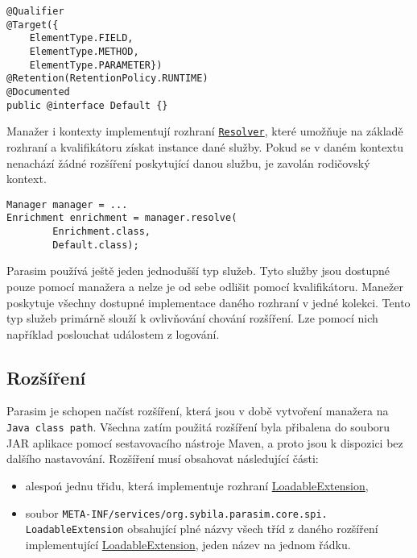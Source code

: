 \begin{lstlisting}[label={code:qualifier}, caption={Kvalikátor}]
@Qualifier
@Target({
	ElementType.FIELD,
	ElementType.METHOD,
	ElementType.PARAMETER})
@Retention(RetentionPolicy.RUNTIME)
@Documented
public @interface Default {}
\end{lstlisting}

Manažer i kontexty implementují rozhraní \href{https://github.com/sybila/parasim/blob/master/core/src/main/java/org/sybila/parasim/core/api/Resolver.java}{\texttt{Resolver}},
které umožňuje na základě rozhraní a kvalifikátoru získat instance dané služby.
Pokud se v daném kontextu nenachází žádné rozšíření poskytující danou službu,
je zavolán rodičovský kontext. 

\begin{lstlisting}[label={code:resolve}, caption={Získání instance služby}]
Manager manager = ...
Enrichment enrichment = manager.resolve(
		Enrichment.class,
		Default.class);
\end{lstlisting}

Parasim používá ještě jeden jednodušší typ služeb. Tyto služby jsou dostupné pouze
pomocí manažera a nelze je od sebe odlišit pomocí kvalifikátoru. Manežer poskytuje
všechny dostupné implementace daného rozhraní v jedné kolekci. Tento typ služeb
primárně  slouží k ovlivňování cho\-vání rozšíření. Lze pomocí nich například
poslouchat událostem z logování.

\subsection{Rozšíření}

Parasim je schopen načíst rozšíření, která jsou v době vytvoření manažera na \texttt{Java class path}.
Všechna zatím použitá rozšíření byla přibalena do souboru JAR aplikace pomocí sestavovacího
nástroje Maven, a proto jsou k dispozici bez dalšího nastavování. Rozšíření musí obsahovat
následující části:

\begin{itemize}
	\item	alespoń jednu třidu, která implementuje rozhraní \href{https://github.com/sybila/parasim/blob/master/core/src/main/java/org/sybila/parasim/core/spi/LoadableExtension.java}{LoadableExtension},
	\item	soubor \texttt{META-INF/services/org.sybila.parasim.core.spi.\\LoadableExtension} obsahující plné názvy všech tříd z daného roz\-ší\-ření implementující \href{https://github.com/sybila/parasim/blob/master/core/src/main/java/org/sybila/parasim/core/spi/LoadableExtension.java}{LoadableExtension}, jeden název na jednom řád\-ku. 
\end{itemize}

